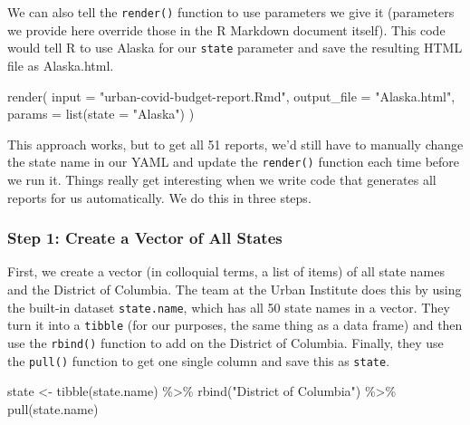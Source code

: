 \documentclass[
]{book}
\newenvironment{Shaded}{\begin{snugshade}}{\end{snugshade}}
\newcommand{\AttributeTok}[1]{\textcolor[rgb]{0.77,0.63,0.00}{#1}}
\newcommand{\FunctionTok}[1]{\textcolor[rgb]{0.00,0.00,0.00}{#1}}
\newcommand{\NormalTok}[1]{#1}
\newcommand{\OtherTok}[1]{\textcolor[rgb]{0.56,0.35,0.01}{#1}}
\newcommand{\SpecialCharTok}[1]{\textcolor[rgb]{0.00,0.00,0.00}{#1}}
\newcommand{\StringTok}[1]{\textcolor[rgb]{0.31,0.60,0.02}{#1}}
\begin{document}
We can also tell the \texttt{render()} function to use parameters we give it (parameters we provide here override those in the R Markdown document itself). This code would tell R to use Alaska for our \texttt{state} parameter and save the resulting HTML file as Alaska.html.

\begin{Shaded}
\begin{Highlighting}[]
\FunctionTok{render}\NormalTok{(}
\AttributeTok{input =} \StringTok{"urban{-}covid{-}budget{-}report.Rmd"}\NormalTok{,}
\AttributeTok{output\_file =} \StringTok{"Alaska.html"}\NormalTok{,}
\AttributeTok{params =} \FunctionTok{list}\NormalTok{(}\AttributeTok{state =} \StringTok{"Alaska"}\NormalTok{)}
\NormalTok{)}
\end{Highlighting}
\end{Shaded}

This approach works, but to get all 51 reports, we'd still have to manually change the state name in our YAML and update the \texttt{render()} function each time before we run it. Things really get interesting when we write code that generates all reports for us automatically. We do this in three steps.

\hypertarget{step-1-create-a-vector-of-all-states}{%
\subsubsection*{Step 1: Create a Vector of All States}\label{step-1-create-a-vector-of-all-states}}

First, we create a vector (in colloquial terms, a list of items) of all state names and the District of Columbia. The team at the Urban Institute does this by using the built-in dataset \texttt{state.name}, which has all 50 state names in a vector. They turn it into a \texttt{tibble} (for our purposes, the same thing as a data frame) and then use the \texttt{rbind()} function to add on the District of Columbia. Finally, they use the \texttt{pull()} function to get one single column and save this as \texttt{state}.

\begin{Shaded}
\begin{Highlighting}[]
\NormalTok{state }\OtherTok{\textless{}{-}} \FunctionTok{tibble}\NormalTok{(state.name) }\SpecialCharTok{\%\textgreater{}\%}
\FunctionTok{rbind}\NormalTok{(}\StringTok{"District of Columbia"}\NormalTok{) }\SpecialCharTok{\%\textgreater{}\%}
\FunctionTok{pull}\NormalTok{(state.name)}
\end{Highlighting}
\end{Shaded}
\end{document}
